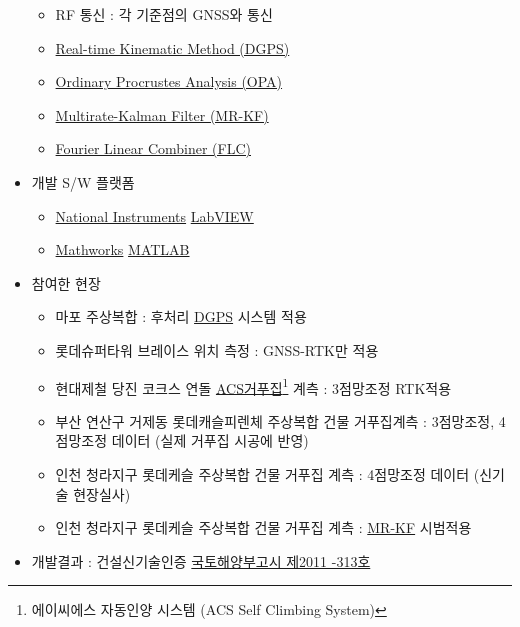 \documentclass[10pt,a4paper,ragged2e]{altacv}
\begin{document}
\begin{fullwidth}
\begin{itemize}
\begin{itemize}
    \item RF 통신 : 각 기준점의 GNSS와 통신
    \item \href{https://en.wikipedia.org/wiki/Differential_GPS}{Real-time Kinematic Method (DGPS)}
    \item \href{https://en.wikipedia.org/wiki/Procrustes_analysis}{Ordinary Procrustes Analysis (OPA)}
    \item \href{http://scholar.lib.vt.edu/theses/available/etd-062899-064821/unrestricted/etd.PDF}{Multirate-Kalman  Filter (MR-KF)}
    \item \href{http://ieeexplore.ieee.org/xpl/login.jsp?tp=\&arnumber=258116\&url=http\%3A\%2F\%2Fieeexplore.ieee.org\%2Fxpls\%2Fabs_all.jsp\%3Farnumber\%3D258116}{Fourier Linear Combiner (FLC)}
  \end{itemize}
\item 개발 S/W 플랫폼
\begin{itemize}
  \item \href{https://en.wikipedia.org/wiki/National_Instruments}{National Instruments} \href{https://en.wikipedia.org/wiki/LabVIEW}{LabVIEW}
  \item \href{https://en.wikipedia.org/wiki/MathWorks}{Mathworks} \href{https://en.wikipedia.org/wiki/MATLAB}{MATLAB}
\end{itemize}
\item 참여한 현장
\begin{itemize}
  \item 마포 주상복합 : 후처리 \href{https://en.wikipedia.org/wiki/Differential_GPS}{DGPS} 시스템 적용 
  \item 롯데슈퍼타워 브레이스 위치 측정 : GNSS-RTK만 적용 
  \item 현대제철 당진 코크스 연돌 \href{https://en.wikipedia.org/wiki/Climbing_formwork}{ACS거푸집}\footnote{에이씨에스 자동인양 시스템 (ACS Self Climbing System)} 계측 : 3점망조정 RTK적용
  \item 부산 연산구 거제동 롯데캐슬피렌체 주상복합 건물 거푸집계측 : 3점망조정, 4점망조정 데이터 (실제 거푸집 시공에 반영)
  \item 인천 청라지구 롯데케슬 주상복합 건물 거푸집 계측 : 4점망조정 데이터 (신기술 현장실사)
  \item 인천 청라지구 롯데케슬 주상복합 건물 거푸집 계측 : \href{http://scholar.lib.vt.edu/theses/available/etd-062899-064821/unrestricted/etd.PDF}{MR-KF} 시범적용
\end{itemize}
\item
  개발결과 : 건설신기술인증
  \href{http://www.kaia.re.kr/portal/newtec/view.do?searchCnd=1\&searchWrd=\&menuNo=200075\&frApntYear=\&toApntYear=\&pageUnit=10\&frApntNo=\&toApntNo=\&cate1=\&cate2=\&cate3=\&tecCat1=\&tecCat2=\&tecCat3=\&newtecCat1=\&newtecCat2=\&newtecCat3=\&dvlprNm=\%ED\%95\%9C\%EA\%B5\%AD\%EC\%9C\%A0\%EC\%A7\%80\%EA\%B4\%80\%EB\%A6\%AC\&ordDvs=\&pageIndex=1\&apntNo=625\&frMenu=list}{국토해양부고시 제2011 -313호}
\end{itemize}


\end{fullwidth}
\end{document}
